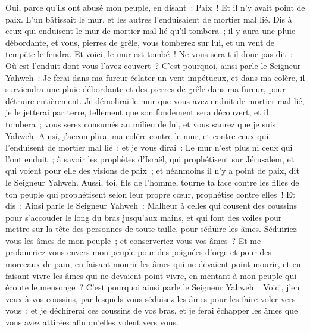 \begin{multicols}{2}
Oui, parce qu'ils ont abusé mon peuple, en disant~: Paix~! Et il n'y avait point de paix. L'un bâtissait le mur, et les autres l'enduisaient de mortier mal lié.
Dis à ceux qui enduisent le mur de mortier mal lié qu'il tombera~; il y aura une pluie débordante, et vous, pierres de grêle, vous tomberez sur lui, et un vent de tempête le fendra.
Et voici, le mur est tombé~! Ne vous sera-t-il donc pas dit~: Où est l'enduit dont vous l'avez couvert~?
C'est pourquoi, ainsi parle le Seigneur Yahweh~: Je ferai dans ma fureur éclater un vent impétueux, et dans ma colère, il surviendra une pluie débordante et des pierres de grêle dans ma fureur, pour détruire entièrement.
Je démolirai le mur que vous avez enduit de mortier mal lié, je le jetterai par terre, tellement que son fondement sera découvert, et il tombera~; vous serez consumés au milieu de lui, et vous saurez que je suis Yahweh.
Ainsi, j'accomplirai ma colère contre le mur, et contre ceux qui l'enduisent de mortier mal lié~; et je vous dirai~: Le mur n'est plus ni ceux qui l'ont enduit~;
à savoir les prophètes d'Israël, qui prophétisent sur Jérusalem, et qui voient pour elle des visions de paix~; et néanmoins il n'y a point de paix, dit le Seigneur Yahweh.
Aussi, toi, fils de l'homme, tourne ta face contre les filles de ton peuple qui prophétisent selon leur propre cœur, prophétise contre elles~!
 Et dis~: Ainsi parle le Seigneur Yahweh~: Malheur à celles qui cousent des coussins pour s'accouder le long du bras jusqu'aux mains, et qui font des voiles pour mettre sur la tête des personnes de toute taille, pour séduire les âmes. Séduiriez-vous les âmes de mon peuple~; et conserveriez-vous vos âmes~?
Et me profaneriez-vous envers mon peuple pour des poignées d'orge et pour des morceaux de pain, en faisant mourir les âmes qui ne devaient point mourir, et en faisant vivre les âmes qui ne devaient point vivre, en mentant à mon peuple qui écoute le mensonge~?
C'est pourquoi ainsi parle le Seigneur Yahweh~: Voici, j'en veux à vos coussins, par lesquels vous séduisez les âmes pour les faire voler vers vous~; et je déchirerai ces coussins de vos bras, et je ferai échapper les âmes que vous avez attirées afin qu'elles volent vers vous.

\end{multicols}
